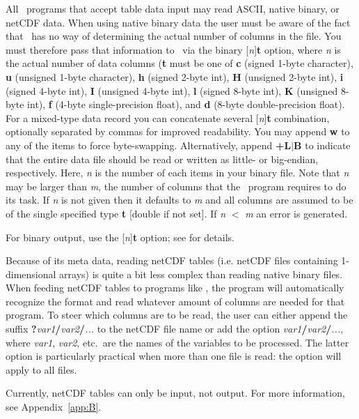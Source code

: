 All \GMT\ programs that accept table data input may read ASCII, native binary, or netCDF data.
When using native binary data the user must be aware
of the fact that \GMT\ has no way of determining the actual
number of columns in the file.  You must therefore pass that
information to \GMT\ via the binary [\emph{n}]\textbf{t} option,
where \emph{n} is the actual number of data columns (\textbf{t}
must be one of \textbf{c} (signed 1-byte character), \textbf{u}
(unsigned 1-byte character), \textbf{h} (signed 2-byte int), \textbf{H}
(unsigned 2-byte int), \textbf{i} (signed 4-byte int), \textbf{I}
(unsigned 4-byte int), \textbf{l} (signed 8-byte int), \textbf{K}
(unsigned 8-byte int), \textbf{f} (4-byte single-precision float), and
\textbf{d} (8-byte double-precision float).  For a mixed-type data record
you can concatenate several [\emph{n}]\textbf{t} combination, optionally
separated by commas for improved readability.  You may append \textbf{w}
to any of the items to force byte-swapping.  Alternatively, append
\textbf{+L}$|$\textbf{B} to indicate that the entire data file
should be read or written as little- or big-endian, respectively.
Here, \emph{n} is the number of each items in your binary file.
Note that \emph{n} may be larger than \emph{m}, the number of
columns that the \GMT\ program requires to do its task.
If \emph{n} is not given then it defaults to \emph{m} and all columns
are assumed to be of the single specified type \textbf{t} [double if not set].
If \emph{n} $<$ \emph{m} an error is generated.

For binary output, use the [\emph{n}]\textbf{t} option; see  for
details.

Because of its meta data, reading netCDF tables (i.e. netCDF files containing 1-dimensional arrays)
is quite a bit less complex than reading native binary files. When feeding netCDF tables to programs
like , the program will automatically recognize the format and read whatever amount of
columns are needed for that program. To steer which columns are to be read, the user can either
append the suffix \textbf{?}\emph{var1}\textbf{/}\emph{var2}\textbf{/}\emph{...} to the netCDF file name
or add the option \emph{var1}\textbf{/}\emph{var2}\textbf{/}\emph{...}, where \emph{var1}, \emph{var2}, etc.\
are the names of the variables to be processed. The latter option is particularly practical when more
than one file is read: the \Opt{bic} option will apply to all files.

Currently, netCDF tables can only be input, not output.
For more information, see Appendix~\ref{app:B}.

